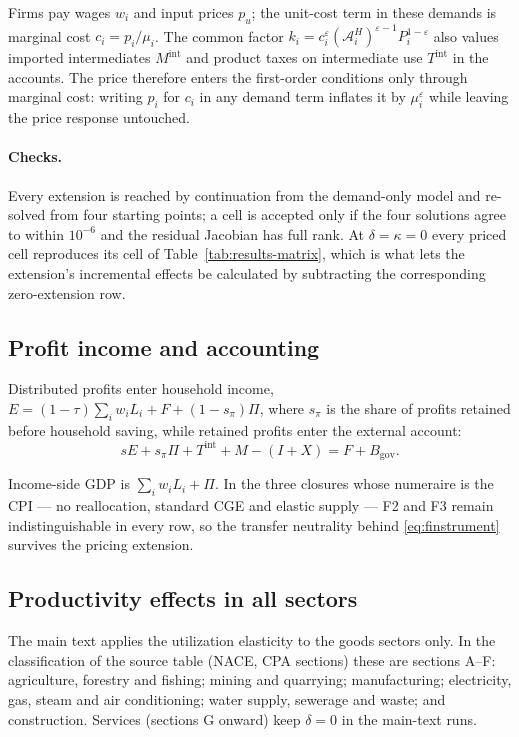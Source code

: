Firms pay wages $w_i$ and input prices $p_u$; the unit-cost term in these
demands is marginal cost $c_i=p_i/\mu_i$. The common factor
$k_i=c_i^{\varepsilon}(\mathcal{A}_i^{H})^{\varepsilon-1}P_i^{1-\varepsilon}$ also values
imported intermediates $M^{\mathrm{int}}$ and product taxes on intermediate use
$T^{\mathrm{int}}$ in the accounts. The price therefore enters the first-order
conditions only through marginal cost: writing $p_i$ for $c_i$ in any demand term
inflates it by $\mu_i^{\varepsilon}$ while leaving the price response untouched.

\paragraph{Checks.} Every extension is reached by continuation from the
demand-only model and re-solved from four starting points; a cell is accepted only if the four solutions agree to within $10^{-6}$ and the residual Jacobian has full rank. At
$\delta=\kappa=0$ every priced cell reproduces its cell of
Table~\ref{tab:results-matrix}, which is what lets the extension's incremental effects be calculated by
subtracting the corresponding zero-extension row.

\subsection{Profit income and accounting}\label{app:pricing-accounting}
Distributed profits enter household income,
$E=(1-\tau)\sum_i w_iL_i+F+(1-s_\pi)\Pi$, where $s_\pi$ is the share of profits
retained before household saving, while retained profits enter the external account:
\begin{equation}\label{eq:app-account}
  sE+s_\pi\Pi+T^{\mathrm{int}}+M-(I+X)
  = F+B_{\mathrm{gov}}.
\end{equation}

Income-side GDP is $\sum_i w_iL_i+\Pi$. In the three closures whose numeraire
is the CPI --- no reallocation, standard CGE and elastic supply --- F2 and
F3 remain indistinguishable in every row, so the transfer neutrality behind
\eqref{eq:finstrument} survives the pricing extension.


\subsection{Productivity effects in all sectors}\label{app:profiles}
The main text applies the utilization elasticity to the goods sectors only. In
the classification of the source table (NACE, CPA sections) these are sections
A--F: agriculture, forestry and fishing; mining and quarrying; manufacturing;
electricity, gas, steam and air conditioning; water supply, sewerage and waste;
and construction. Services (sections G onward) keep $\delta = 0$ in the
main-text runs.

